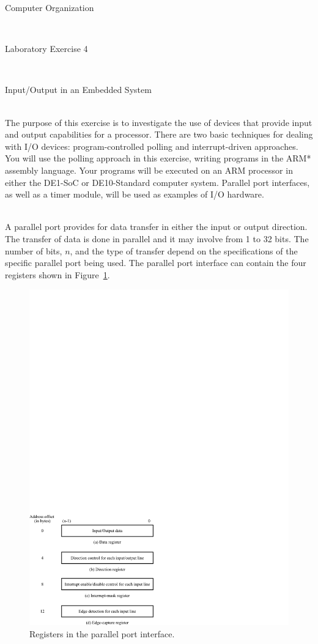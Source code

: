 \documentclass[epsfig,10pt,fullpage]{article}
\newcommand{\LabNum}{4}
\begin{document}
\centerline{\huge Computer Organization}
~\\
\centerline{\huge Laboratory Exercise \LabNum}
~\\
\centerline{\large Input/Output in an Embedded System}
~\\

\noindent
The purpose of this exercise is to investigate the use of devices that provide input and
output capabilities for a processor. There are two basic techniques for dealing with I/O devices:
program-controlled polling and interrupt-driven approaches.  You will use the polling approach 
in this exercise, writing programs in the ARM* assembly language. 
Your programs will be executed on an ARM processor in either the DE1-SoC or DE10-Standard
computer system.  Parallel port interfaces, 
as well as a timer module, will be used as examples of I/O hardware.

~\\
\noindent
A parallel port provides for data transfer in either the input or output direction.  The 
transfer of data is done in parallel and it may involve from 1 to 32 bits. The number of
bits, $n$, and the type of transfer depend on the specifications of the specific parallel port 
being used.  The parallel port interface can contain the four registers shown in
Figure~\ref{fig:parallel}.

\begin{figure}[htb]
	\begin{center}
	\includegraphics[scale=1]{figures/figureparallel.pdf}
	\end{center}
	\caption{Registers in the parallel port interface.}
\label{fig:parallel}
\end{figure}
\end{document}
